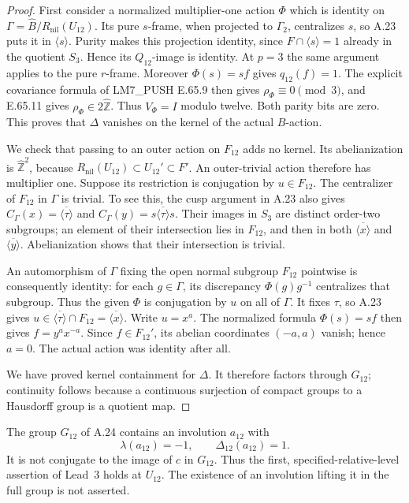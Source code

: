 \begin{proof}
First consider a normalized multiplier-one action
\(\Phi\) which is identity on
\(\Gamma=\widehat B/R_{\mathrm{nil}}(U_{12})\).
Its pure \(s\)-frame, when projected to \(\Gamma_2\),
centralizes \(s\), so A.23 puts it in
\(\langle s\rangle\). Purity makes this projection
identity, since \(F\cap\langle s\rangle=1\)
already in the quotient \(S_3\). Hence its
\(Q_{12}\)-image is identity. At \(p=3\) the
same argument applies to the pure \(r\)-frame.
Moreover \(\Phi(s)=sf\) gives \(q_{12}(f)=1\).
The explicit covariance formula of LM7\_PUSH
E.65.9 then gives \(\rho_\Phi\equiv0\pmod3\),
and E.65.11 gives \(\rho_\Phi\in2\widehat{\mathbb Z}\).
Thus \(V_\Phi=I\) modulo twelve. Both parity
bits are zero. This proves that \(\Delta\)
vanishes on the kernel of the actual \(B\)-action.

We check that passing to an outer action on
\(F_{12}\) adds no kernel. Its abelianization is
\(\widehat{\mathbb Z}^2\), because
\(R_{\mathrm{nil}}(U_{12})\subset U_{12}'\subset F'\).
An outer-trivial action therefore has multiplier
one. Suppose its restriction is conjugation by
\(u\in F_{12}\). The centralizer of \(F_{12}\)
in \(\Gamma\) is trivial. To see this, the cusp
argument in A.23 also gives
\(C_\Gamma(x)=\overline{\langle\tau\rangle}\)
and
\(C_\Gamma(y)=s\overline{\langle\tau\rangle}s\).
Their images in \(S_3\) are distinct order-two
subgroups; an element of their intersection lies
in \(F_{12}\), and then in both
\(\overline{\langle x\rangle}\) and
\(\overline{\langle y\rangle}\). Abelianization
shows that their intersection is trivial.

An automorphism of \(\Gamma\) fixing the open
normal subgroup \(F_{12}\) pointwise is consequently
identity: for each \(g\in\Gamma\), its discrepancy
\(\Phi(g)g^{-1}\) centralizes that subgroup.
Thus the given \(\Phi\) is conjugation by \(u\)
on all of \(\Gamma\). It fixes \(\tau\), so A.23
gives \(u\in\overline{\langle\tau\rangle}\cap F_{12}
=\overline{\langle x\rangle}\). Write \(u=x^a\).
The normalized formula \(\Phi(s)=sf\) then gives
\(f=y^a x^{-a}\). Since \(f\in F_{12}'\), its
abelian coordinates \((-a,a)\) vanish; hence
\(a=0\). The actual action was identity after all.

We have proved kernel containment for \(\Delta\).
It therefore factors through \(G_{12}\); continuity
follows because a continuous surjection of compact
groups to a Hausdorff group is a quotient map.
\end{proof}

The group \(G_{12}\) of A.24 contains an involution
\(a_{12}\) with
\[
             \lambda(a_{12})=-1,
             \qquad\Delta_{12}(a_{12})=1.
\]
It is not conjugate to the image of \(c\) in
\(G_{12}\). Thus the first, specified-relative-level
assertion of Lead~3 holds at \(U_{12}\).
The existence of an involution lifting it in the
full group is not asserted.

